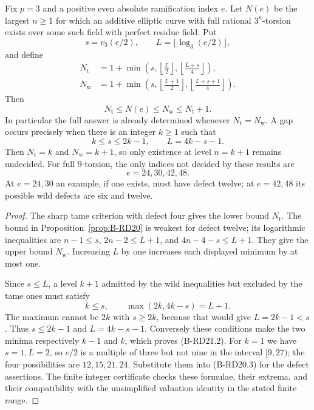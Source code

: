 \begin{corollary}
\label{cor:B-RD21}
Fix $p=3$ and a positive even absolute ramification index $e$.
Let $N(e)$ be the largest $n\geq1$ for which an additive elliptic
curve with full rational $3^n$-torsion exists over some such field
with perfect residue field. Put
\[
 s=v_3(e/2),\qquad L=\lfloor\log_3(e/2)\rfloor,
\]
and define
\begin{align*}
 N_{\mathrm t}
   &=1+\min\left(s,\left\lfloor\frac L2\right\rfloor,
                         \left\lfloor\frac{L+s}{4}\right\rfloor\right),\\
 N_{\mathrm w}
   &=1+\min\left(s,\left\lfloor\frac{L+1}{2}\right\rfloor,
                         \left\lfloor\frac{L+s+1}{4}\right\rfloor\right).
\end{align*}
Then
\[
             N_{\mathrm t}\leq N(e)\leq N_{\mathrm w}
                             \leq N_{\mathrm t}+1.       \tag{B-RD21.1}
\]
In particular the full answer is already determined whenever
$N_{\mathrm t}=N_{\mathrm w}$. A gap occurs precisely when there is
an integer $k\geq1$ such that
\[
             k\leq s\leq2k-1,\qquad L=4k-s-1.          \tag{B-RD21.2}
\]
Then $N_{\mathrm t}=k$ and $N_{\mathrm w}=k+1$, so only existence
at level $n=k+1$ remains undecided. For full $9$-torsion, the only
indices not decided by these results are
\[
                              e=24,30,42,48.            \tag{B-RD21.3}
\]
At $e=24,30$ an example, if one exists, must have defect twelve;
at $e=42,48$ its possible wild defects are six and twelve.
\end{corollary}
\begin{proof}
The sharp tame criterion with defect four gives the lower bound
$N_{\mathrm t}$. The bound in Proposition~\ref{prop:B-RD20} is
weakest for defect twelve; its logarithmic inequalities are
$n-1\leq s$, $2n-2\leq L+1$, and $4n-4-s\leq L+1$.
They give the upper bound $N_{\mathrm w}$. Increasing $L$ by one
increases each displayed minimum by at most one.

Since $s\leq L$, a level $k+1$ admitted by the wild inequalities
but excluded by the tame ones must satisfy
\[
 k\leq s,\qquad \max(2k,4k-s)=L+1.
\]
The maximum cannot be $2k$ with $s\geq2k$, because that would
give $L=2k-1<s$. Thus $s\leq2k-1$ and $L=4k-s-1$.
Conversely these conditions make the two minima respectively
$k-1$ and $k$, which proves (B-RD21.2).
For $k=1$ we have $s=1,L=2$, so $e/2$ is a multiple of three
but not nine in the interval $[9,27)$; the four possibilities
are $12,15,21,24$. Substitute them into (B-RD20.3) for the
defect assertions. The finite integer certificate
 checks these formulae,
their extrema, and their compatibility with the unsimplified
valuation identity in the stated finite range.
\end{proof}



